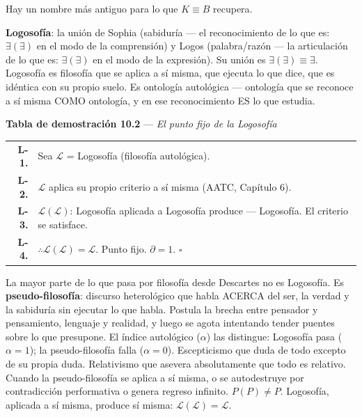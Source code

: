 \documentclass[10pt, openany, oneside]{book}
\renewcommand{\footnotesize}{\fontsize{8.5}{11}\selectfont}
\begin{document}
\vspace{1em}

\noindent Hay un nombre más antiguo para lo que $K \equiv B$ recupera.

\textbf{Logosofía}: la unión de Sophia (sabiduría --- el reconocimiento de lo que es: $\exists(\exists)$ en el modo de la comprensión) y Logos (palabra/razón --- la articulación de lo que es: $\exists(\exists)$ en el modo de la expresión). Su unión es $\exists(\exists) \equiv \exists$. Logosofía es filosofía que se aplica a sí misma, que ejecuta lo que dice, que es idéntica con su propio suelo. Es ontología autológica --- ontología que se reconoce a sí misma COMO ontología, y en ese reconocimiento ES lo que estudia.

\vspace{0.5em}

\textbf{Tabla de demostración 10.2} --- \textit{El punto fijo de la Logosofía}

\vspace{0.5em}

{\footnotesize
\noindent\begin{tabular}{r p{}}
\textbf{L-1.} & Sea $\mathcal{L}$ = Logosofía (filosofía autológica). \\[0.3em]
\textbf{L-2.} & $\mathcal{L}$ aplica su propio criterio a sí misma (AATC, Capítulo 6). \\[0.3em]
\textbf{L-3.} & $\mathcal{L}(\mathcal{L})$: Logosofía aplicada a Logosofía produce --- Logosofía. El criterio se satisface. \\[0.3em]
\textbf{L-4.} & $\therefore \mathcal{L}(\mathcal{L}) = \mathcal{L}$. Punto fijo. $\partial = 1$. $\square$ \\[0.3em]
\end{tabular}
}

\vspace{0.8em}

\noindent La mayor parte de lo que pasa por filosofía desde Descartes no es Logosofía. Es \textbf{pseudo-filosofía}: discurso heterológico que habla ACERCA del ser, la verdad y la sabiduría sin ejecutar lo que habla. Postula la brecha entre pensador y pensamiento, lenguaje y realidad, y luego se agota intentando tender puentes sobre lo que presupone. El índice autológico ($\alpha$) las distingue: Logosofía pasa ($\alpha = 1$); la pseudo-filosofía falla ($\alpha = 0$). Escepticismo que duda de todo excepto de su propia duda. Relativismo que asevera absolutamente que todo es relativo. Cuando la pseudo-filosofía se aplica a sí misma, o se autodestruye por contradicción performativa o genera regreso infinito. $P(P) \neq P$. Logosofía, aplicada a sí misma, produce sí misma: $\mathcal{L}(\mathcal{L}) = \mathcal{L}$.
\end{document}
